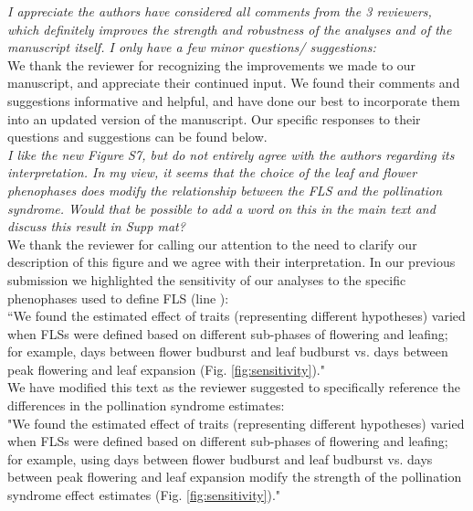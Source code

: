\documentclass{article}[11pt]
\begin{document}
\setlength\parindent{0pt}

\textit{I appreciate the authors have considered all comments from the 3 reviewers, which definitely improves the strength and robustness of the analyses and of the manuscript itself. I only have a few minor questions/ suggestions:}\\

We thank the reviewer for recognizing the improvements we made to our manuscript, and appreciate their continued input. We found their comments and suggestions informative and helpful, and have done our best to incorporate them into an updated version of the manuscript. Our specific responses to their questions and suggestions can be found below.\\

\textit{I like the new Figure S7, but do not entirely agree with the authors regarding its interpretation. In my view, it seems that the choice of the leaf and flower phenophases does modify the relationship between the FLS and the pollination syndrome. Would that be possible to add a word on this in the main text and discuss this result in Supp mat?}\\

We thank the reviewer for calling our attention to the need to clarify our description of this figure and we agree with their interpretation. In our previous submission we highlighted the sensitivity of our analyses to the specific phenophases used to define FLS (line ):\\

``We found the estimated effect of traits (representing different hypotheses) varied when FLSs were defined based on different sub-phases of flowering and leafing; for example, days between flower budburst and leaf budburst vs. days between peak flowering and leaf expansion (Fig. \ref{fig:sensitivity})."\\ 

We have modified this text as the reviewer suggested to specifically reference the differences in the pollination syndrome estimates:\\

"We found the estimated effect of traits (representing different hypotheses) varied when FLSs were defined based on different sub-phases of flowering and leafing; for example, using days between flower budburst and leaf budburst vs. days between peak flowering and leaf expansion modify the strength of the pollination syndrome effect estimates (Fig. \ref{fig:sensitivity})." \\
\end{document}
